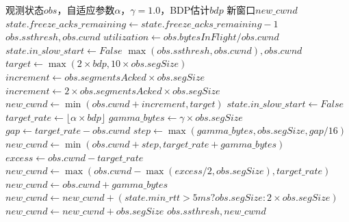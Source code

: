 \begin{algorithm}[htbp]
\caption{融合控制策略算法}
\begin{algorithmic}[1]
\Require 观测状态$obs$，自适应参数$\alpha$，$\gamma = 1.0$，BDP估计$bdp$
\Ensure 新窗口$new\_cwnd$
\State {}
    \State $state.freeze\_acks\_remaining \leftarrow state.freeze\_acks\_remaining - 1$
    \State \Return $obs.ssthresh, obs.cwnd$
\EndIf
\State {}
\State $utilization \leftarrow obs.bytesInFlight / obs.cwnd$
\State {}
    \State {}
        \State $state.in\_slow\_start \leftarrow False$
        \State \Return $\max(obs.ssthresh, obs.cwnd), obs.cwnd$
    \EndIf
    \State $target \leftarrow \max(2 \times bdp, 10 \times obs.segSize)$
    \State $increment \leftarrow obs.segmentsAcked \times obs.segSize$
        \State $increment \leftarrow 2 \times obs.segmentsAcked \times obs.segSize$
    \EndIf
    \State $new\_cwnd \leftarrow \min(obs.cwnd + increment, target)$
\Else
    \State {}
    \State $state.in\_slow\_start \leftarrow False$
    \State $target\_rate \leftarrow \lfloor \alpha \times bdp \rfloor$
    \State $gamma\_bytes \leftarrow \gamma \times obs.segSize$
        \State $gap \leftarrow target\_rate - obs.cwnd$
        \State $step \leftarrow \max(gamma\_bytes, obs.segSize, gap / 16)$
        \State $new\_cwnd \leftarrow \min(obs.cwnd + step, target\_rate + gamma\_bytes)$
        \State $excess \leftarrow obs.cwnd - target\_rate$
        \State $new\_cwnd \leftarrow \max(obs.cwnd - \max(excess / 2, obs.segSize), target\_rate)$
    \Else
        \State $new\_cwnd \leftarrow obs.cwnd + gamma\_bytes$
    \EndIf
    \State {}
        \State $new\_cwnd \leftarrow new\_cwnd + (state.min\_rtt > 5ms ? obs.segSize : 2 \times obs.segSize)$
        \State $new\_cwnd \leftarrow new\_cwnd + obs.segSize$
    \EndIf
\EndIf
\State \Return $obs.ssthresh, new\_cwnd$
\end{algorithmic}
\end{algorithm}

